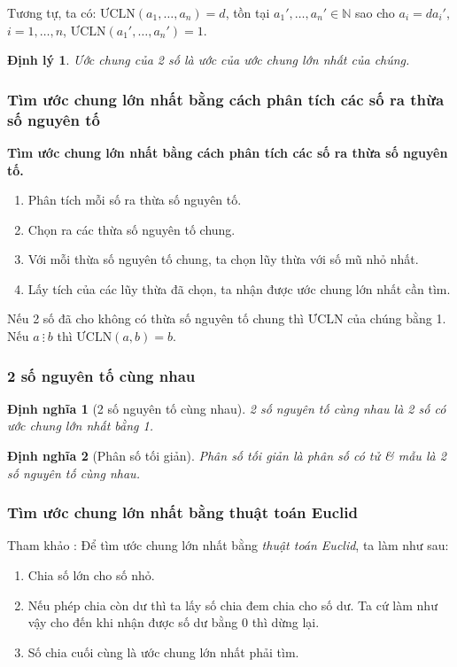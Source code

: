 \documentclass{article}
\numberwithin{equation}{section}
\newtheorem{dinhnghia}{Định nghĩa}[section]
\newtheorem{dinhly}{Định lý}[section]
\begin{document}
Tương tự, ta có: $\mbox{ƯCLN}(a_1,\ldots,a_n)= d$, tồn tại $a_1',\ldots,a_n'\in\mathbb{N}$ sao cho $a_i = da_i'$, $i = 1,\ldots, n$, $\mbox{ƯCLN}(a_1',\ldots,a_n') = 1$.

\begin{dinhly}
	Ước chung của 2 số là ước của ước chung lớn nhất của chúng.
\end{dinhly}

\subsubsection{Tìm ước chung lớn nhất bằng cách phân tích các số ra thừa số nguyên tố}
\begin{tcolorbox}
	\textbf{Tìm ước chung lớn nhất bằng cách phân  tích các số ra thừa số nguyên tố.}
	\begin{enumerate}
		\item Phân tích mỗi số ra thừa số nguyên tố.
		\item Chọn ra các thừa số nguyên tố chung.
		\item Với mỗi thừa số nguyên tố chung, ta chọn lũy thừa với số mũ nhỏ nhất.
		\item Lấy tích của các lũy thừa đã chọn, ta nhận được ước chung lớn nhất cần tìm.
	\end{enumerate}
\end{tcolorbox}
Nếu 2 số đã cho không có thừa số nguyên tố chung thì ƯCLN của chúng bằng 1. Nếu $a\ \vdots\ b$ thì $\mbox{ƯCLN}(a,b) = b$.

\subsubsection{2 số nguyên tố cùng nhau}

\begin{dinhnghia}[2 số nguyên tố cùng nhau]
	\emph{2 số nguyên tố cùng nhau} là 2 số có ước chung lớn nhất bằng 1.
\end{dinhnghia}

\begin{dinhnghia}[Phân số tối giản]
	\emph{Phân số tối giản} là phân số có tử \textit{\&} mẫu là 2 số nguyên tố cùng nhau.
\end{dinhnghia}

\subsubsection{Tìm ước chung lớn nhất bằng thuật toán Euclid}
Tham khảo \cite[p. 52]{SGK_Toan_6_Canh_Dieu_tap_1}: Để tìm ước chung lớn nhất bằng \textit{thuật toán Euclid}, ta làm như sau:
\begin{enumerate}
	\item Chia số lớn cho số nhỏ.
	\item Nếu phép chia còn dư thì ta lấy số chia đem chia cho số dư. Ta cứ làm như vậy cho đến khi nhận được số dư bằng 0 thì dừng lại.
	\item Số chia cuối cùng là ước chung lớn nhất phải tìm.
\end{enumerate}
\end{document}
